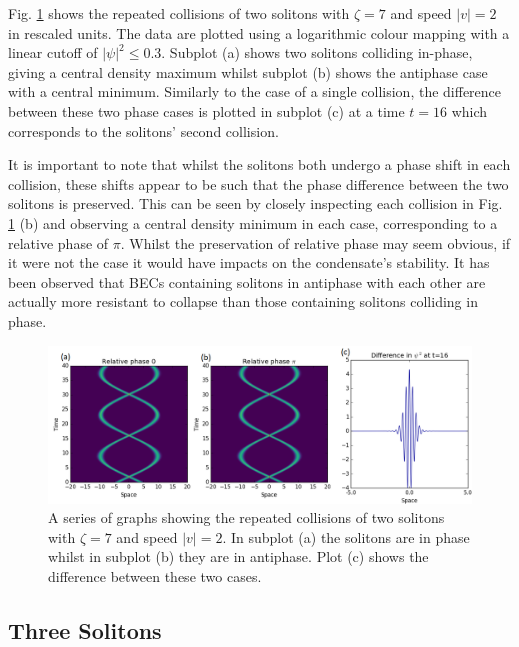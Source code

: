 \documentclass[10pt, twocolumn]{revtex4}    %
\begin{document}
Fig. \ref{repeated} shows the repeated collisions of two solitons with $\zeta=7$ and speed $|v|=2$ in rescaled units. The data are plotted using a logarithmic colour mapping with a linear cutoff of $|\psi|^2 \leq 0.3$. Subplot (a) shows two solitons colliding in-phase, giving a central density maximum whilst subplot (b) shows the antiphase case with a central minimum. Similarly to the case of a single collision, the difference between these two phase cases is plotted in subplot (c) at a time $t=16$ which corresponds to the solitons' second collision. 

It is important to note that whilst the solitons both undergo a phase shift in each collision, these shifts appear to be such that the phase difference between the two solitons is preserved. This can be seen by closely inspecting each collision in Fig. \ref{repeated} (b) and observing a central density minimum in each case, corresponding to a relative phase of $\pi$. Whilst the preservation of relative phase may seem obvious, if it were not the case it would have impacts on the condensate's stability. It has been observed \cite{Collapse} that BECs containing solitons in antiphase with each other are actually more resistant to collapse than those containing solitons colliding in phase. 

\begin{figure}
\includegraphics[width=\textwidth]{difference-g7.png}
\caption{A series of graphs showing the repeated collisions of two solitons with $\zeta=7$ and speed $|v|=2$. In subplot (a) the solitons are in phase whilst in subplot (b) they are in antiphase. Plot (c) shows the difference between these two cases.}
\label{repeated}
\end{figure}


\subsection{Three Solitons}
\end{document}
